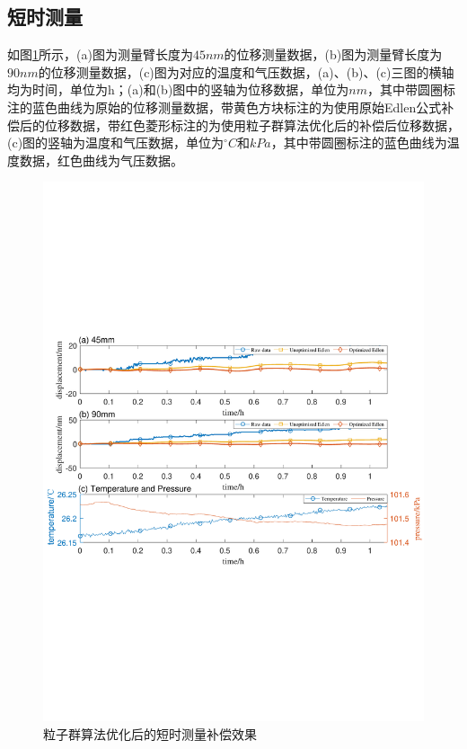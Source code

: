 \subsection{短时测量}
如图\ref{fig:粒子群算法优化后的短时测量补偿效果}所示，(a)图为测量臂长度为$45nm$的位移测量数据，(b)图为测量臂长度为$90nm$的位移测量数据，(c)图为对应的温度和气压数据，(a)、(b)、(c)三图的横轴均为时间，单位为h；(a)和(b)图中的竖轴为位移数据，单位为$nm$，其中带圆圈标注的蓝色曲线为原始的位移测量数据，带黄色方块标注的为使用原始Edlen公式补偿后的位移数据，带红色菱形标注的为使用粒子群算法优化后的补偿后位移数据，(c)图的竖轴为温度和气压数据，单位为$^{\circ}C$和$kPa$，其中带圆圈标注的蓝色曲线为温度数据，红色曲线为气压数据。
\begin{figure}[htb]
    \centering
    \includegraphics[width=14cm]{fig/4-fig/edpso_短时测量实验数据.pdf}
    \caption{粒子群算法优化后的短时测量补偿效果}
    \label{fig:粒子群算法优化后的短时测量补偿效果}
\end{figure}

